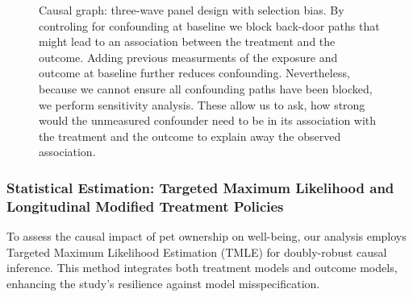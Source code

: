 \documentclass[
  singlecolumn,
  9pt]{article}
\begin{document}
\newpage{}

\begin{figure}


\caption{\label{fig-outcomewide-dag}Causal graph: three-wave panel
design with selection bias. By controling for confounding at baseline we
block back-door paths that might lead to an association between the
treatment and the outcome. Adding previous measurments of the exposure
and outcome at baseline further reduces confounding. Nevertheless,
because we cannot ensure all confounding paths have been blocked, we
perform sensitivity analysis. These allow us to ask, how strong would
the unmeasured confounder need to be in its association with the
treatment and the outcome to explain away the observed association.}

\end{figure}%

\newpage{}

\subsubsection{Statistical Estimation: Targeted Maximum Likelihood and
Longitudinal Modified Treatment
Policies}\label{statistical-estimation-targeted-maximum-likelihood-and-longitudinal-modified-treatment-policies}

To assess the causal impact of pet ownership on well-being, our analysis
employs Targeted Maximum Likelihood Estimation (TMLE) for doubly-robust
causal inference. This method integrates both treatment models and
outcome models, enhancing the study's resilience against model
misspecification.
\end{document}
